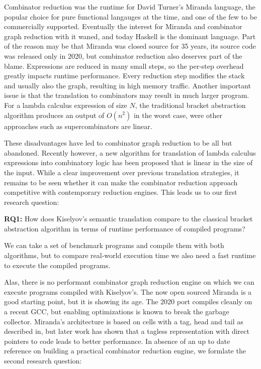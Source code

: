 \documentclass[conference]{IEEEtran}
\begin{document}
Combinator reduction was the runtime for David Turner's Miranda language\cite{turner_miranda_1985}, the popular choice for pure functional langauges at the time, and one of the few to be commercially supported.
Eventually the interest for Miranda and combinator graph reduction with it waned, and today Haskell is the dominant language.
Part of the reason may be that Miranda was closed source for 35 years, its source code was released only in 2020\cite{noauthor_open_2021}, but combinator reduction also deserves part of the blame.
Expressions are reduced in many small steps, so the per-step overhead greatly impacts runtime performance.
Every reduction step modifies the stack and usually also the graph, resulting in high memory traffic.
Another important issue is that the translation to combinators may result in much larger program.
For a lambda calculus expression of size $N$, the traditional bracket abstraction algorithm produces an output of $O(n^2)$ in the worst case, were other approaches such as supercombinators are linear.

These disadvantages have led to combinator graph reduction to be all but abandoned.
Recently however, a new algorithm for translation of lambda calculus expressions into combinatory logic has been proposed that is linear in the size of the input\cite{kiselyov_lambda_2018}.
While a clear improvement over previous translation strategies, it remains to be seen whether it can make the combinator reduction approach competitive with contemporary reduction engines.
This leads us to our first research question:

\textbf{RQ1:} How does Kiselyov's semantic translation compare to the classical bracket abstraction algorithm in terms of runtime performance of compiled programs?

We can take a set of benchmark programs and compile them with both algorithms, but to compare real-world execution time we also need a fast runtime to execute the compiled programs.

Alas, there is no performant combinator graph reduction engine on which we can execute programs compiled with Kiselyov's.
The now open sourced Miranda is a good starting point, but it is showing its age.
The 2020 port compiles cleanly on a recent GCC, but enabling optimizations is known to break the garbage collector.
Miranda's architecture is based on cells with a tag, head and tail as described in\cite{turner_new_1979}, but later work has shown that a tagless representation with direct pointers to code leads to better performance\cite{koopman_fresh_1989}.
In absence of an up to date reference on building a practical combinator reduction engine, we formlate the second research question:
\end{document}
